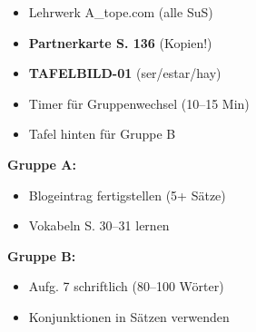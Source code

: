 \documentclass[11pt, a4paper]{article}
\begin{document}
\begin{minipage}[t]{0.48\textwidth}
\begin{tcolorbox}[
    colback=hellgrau,
    colframe=phase,
    title={\footnotesize\bfseries Material-Checkliste},
    fonttitle=\bfseries,
    boxrule=0.5pt,
    top=2pt, bottom=2pt, left=4pt, right=4pt
]
\footnotesize
\begin{itemize}
\item[$\square$] Lehrwerk A\_tope.com (alle SuS)
\item[$\square$] \textbf{Partnerkarte S. 136} (Kopien!)
\item[$\square$] \textbf{TAFELBILD-01} (ser/estar/hay)
\item[$\square$] Timer für Gruppenwechsel (10--15 Min)
\item[$\square$] Tafel hinten für Gruppe B
\end{itemize}
\end{tcolorbox}
\end{minipage}
\hfill
\begin{minipage}[t]{0.48\textwidth}
\begin{tcolorbox}[
    colback=spanisch!10,
    colframe=spanisch,
    title={\footnotesize\bfseries Hausaufgabe},
    fonttitle=\bfseries,
    boxrule=0.5pt,
    top=2pt, bottom=2pt, left=4pt, right=4pt
]
\footnotesize
\textbf{Gruppe A:}
\begin{itemize}
\item Blogeintrag fertigstellen (5+ Sätze)
\item Vokabeln S. 30--31 lernen
\end{itemize}
\textbf{Gruppe B:}
\begin{itemize}
\item Aufg. 7 schriftlich (80--100 Wörter)
\item Konjunktionen in Sätzen verwenden
\end{itemize}
\end{tcolorbox}
\end{minipage}

\vspace{0.3cm}

\end{document}
